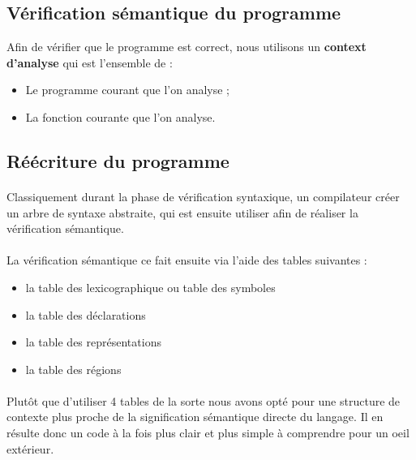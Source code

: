 \subsection{Vérification sémantique du programme}

Afin de vérifier que le programme est correct, nous utilisons un
\textbf{context d'analyse} qui est l'ensemble de :
\begin{itemize}
    \item Le programme courant que l'on analyse ;
    \item La fonction courante que l'on analyse.
\end{itemize}


\subsection{Réécriture du programme}


\paragraph{}Classiquement durant la phase de vérification syntaxique, un compilateur créer un
arbre de syntaxe abstraite, qui est ensuite utiliser afin de réaliser la vérification sémantique.


\paragraph{}La vérification sémantique ce fait ensuite via l'aide des tables suivantes :

\begin{itemize}
 \item la table des lexicographique ou table des symboles
 \item la table des déclarations
 \item la table des représentations
 \item la table des régions
\end{itemize}

\paragraph{}Plutôt que d'utiliser 4 tables de la sorte nous avons opté pour une structure de contexte
plus proche de la signification sémantique directe du langage.
Il en résulte donc un code à la fois plus clair et plus simple à comprendre pour un oeil extérieur.

